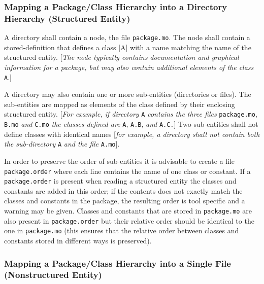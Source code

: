 \subsubsection{Mapping a Package/Class Hierarchy into a Directory Hierarchy (Structured Entity)}

A directory shall contain a node, the file \lstinline[basicstyle=\ttfamily]!package.mo!. The node shall contain a stored-definition that defines a class {[}A{]} with a name
matching the name of the structured entity. {[}\emph{The node typically
contains documentation and graphical information for a package, but may
also contain additional elements of the class} \lstinline[basicstyle=\ttfamily]!A!.{]}

A directory may also contain one or more sub-entities (directories or
files). The sub-entities are mapped as elements of the class defined by
their enclosing structured entity. {[}\emph{For example, if directory} \lstinline[basicstyle=\ttfamily]!A!
\emph{contains the three files} \lstinline[basicstyle=\ttfamily]!package.mo!, \lstinline[basicstyle=\ttfamily]!B.mo! \emph{and} 
\lstinline[basicstyle=\ttfamily]!C.mo!
\emph{the classes defined are} \lstinline[basicstyle=\ttfamily]!A!, \lstinline[basicstyle=\ttfamily]!A.B!, \emph{and} \lstinline[basicstyle=\ttfamily]!A.C.!{]} Two
sub-entities shall not define classes with identical names {[}\emph{for
example, a directory shall not contain both the sub-directory} \lstinline[basicstyle=\ttfamily]!A!
\emph{and the file} \lstinline[basicstyle=\ttfamily]!A.mo!{]}.

In order to preserve the order of sub-entities it is advisable to create
a file \lstinline[basicstyle=\ttfamily]!package.order! where each line contains the name of one class or
constant. If a \lstinline[basicstyle=\ttfamily]!package.order! is present when reading a structured entity
the classes and constants are added in this order; if the contents does
not exactly match the classes and constants in the package, the
resulting order is tool specific and a warning may be given. Classes and
constants that are stored in \lstinline[basicstyle=\ttfamily]!package.mo! are also present in
\lstinline[basicstyle=\ttfamily]!package.order! but their relative order should be identical to the one in
\lstinline[basicstyle=\ttfamily]!package.mo! (this ensures that the relative order between classes and
constants stored in different ways is preserved).

\subsubsection{Mapping a Package/Class Hierarchy into a Single File (Nonstructured Entity)}

